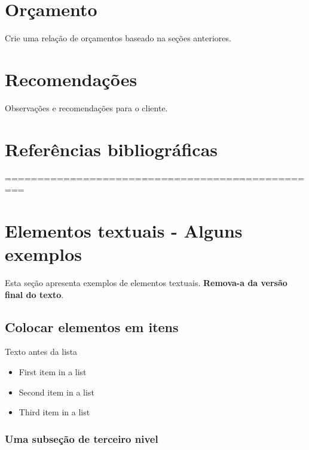 \documentclass[	DIV=calc,%
							paper=a4,%
							fontsize=12pt,%
							onecolumn]{scrartcl}	 					%
\begin{document}
\section{Orçamento}
Crie uma relação de orçamentos baseado na seções anteriores.

\section{Recomendações}
Observações e recomendações para o cliente.

\section{Referências bibliográficas}

\renewcommand\refname{} %

  












=================================================
\section{Elementos textuais - Alguns exemplos}

Esta seção apresenta exemplos de elementos textuais. \textbf{Remova-a da versão final do texto}.


\subsection{Colocar elementos em itens}

Texto antes da lista

\begin{itemize}
	\item First item in a list 
	\item Second item in a list 
	\item Third item in a list
\end{itemize}

\subsubsection{Uma subseção de terceiro nivel}
\end{document}
